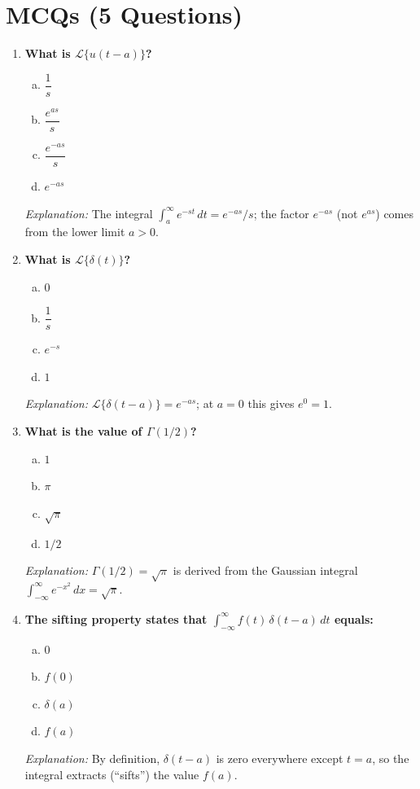 \documentclass[12pt,a4paper]{article}
\begin{document}
\section{MCQs (5 Questions)}

\begin{enumerate}

\item \textbf{What is $\mathcal{L}\{u(t-a)\}$?}
\begin{enumerate}[(a)]
  \item $\dfrac{1}{s}$
  \item $\dfrac{e^{as}}{s}$
  \item \textbf{$\dfrac{e^{-as}}{s}$}
  \item $e^{-as}$
\end{enumerate}
\textit{Explanation:} The integral $\int_a^{\infty} e^{-st}\,dt = e^{-as}/s$;
the factor $e^{-as}$ (not $e^{as}$) comes from the lower limit $a > 0$.

\item \textbf{What is $\mathcal{L}\{\delta(t)\}$?}
\begin{enumerate}[(a)]
  \item $0$
  \item $\dfrac{1}{s}$
  \item $e^{-s}$
  \item \textbf{$1$}
\end{enumerate}
\textit{Explanation:} $\mathcal{L}\{\delta(t-a)\} = e^{-as}$; at $a = 0$
this gives $e^0 = 1$.

\item \textbf{What is the value of $\Gamma(1/2)$?}
\begin{enumerate}[(a)]
  \item $1$
  \item $\pi$
  \item \textbf{$\sqrt{\pi}$}
  \item $1/2$
\end{enumerate}
\textit{Explanation:} $\Gamma(1/2) = \sqrt{\pi}$ is derived from the
Gaussian integral $\int_{-\infty}^{\infty} e^{-x^2}\,dx = \sqrt{\pi}$.

\item \textbf{The sifting property states that $\int_{-\infty}^{\infty}
f(t)\,\delta(t-a)\,dt$ equals:}
\begin{enumerate}[(a)]
  \item $0$
  \item $f(0)$
  \item $\delta(a)$
  \item \textbf{$f(a)$}
\end{enumerate}
\textit{Explanation:} By definition, $\delta(t-a)$ is zero everywhere except
$t = a$, so the integral extracts (``sifts'') the value $f(a)$.


\end{enumerate}
\end{document}

